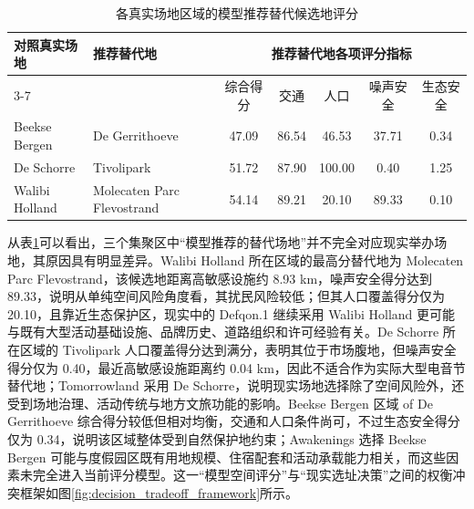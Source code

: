 \documentclass[11pt,a4paper,fontset=fandol]{ctexart}
\begin{document}
\begin{table}[H]
\centering
\caption{各真实场地区域的模型推荐替代候选地评分}
\label{tab:regional_top_non_real_candidates}
\begin{tabularx}{\textwidth}{l X ccccc}
\toprule
对照真实场地 & 推荐替代地 & \multicolumn{5}{c}{推荐替代地各项评分指标} \\
\cmidrule(lr){3-7}
& & 综合得分 & 交通 & 人口 & 噪声安全 & 生态安全 \\
\midrule
Beekse Bergen & De Gerrithoeve & 47.09 & 86.54 & 46.53 & 37.71 & 0.34 \\
De Schorre & Tivolipark & 51.72 & 87.90 & 100.00 & 0.40 & 1.25 \\
Walibi Holland & Molecaten Parc Flevostrand & 54.14 & 89.21 & 20.10 & 89.33 & 0.10 \\
\bottomrule
\end{tabularx}
\end{table}

从表\ref{tab:regional_top_non_real_candidates}可以看出，三个集聚区中“模型推荐的替代场地”并不完全对应现实举办场地，其原因具有明显差异。Walibi Holland 所在区域的最高分替代地为 Molecaten Parc Flevostrand，该候选地距离高敏感设施约 8.93 km，噪声安全得分达到 89.33，说明从单纯空间风险角度看，其扰民风险较低；但其人口覆盖得分仅为 20.10，且靠近生态保护区，现实中的 Defqon.1 继续采用 Walibi Holland 更可能与既有大型活动基础设施、品牌历史、道路组织和许可经验有关。De Schorre 所在区域的 Tivolipark 人口覆盖得分达到满分，表明其位于市场腹地，但噪声安全得分仅为 0.40，最近高敏感设施距离约 0.04 km，因此不适合作为实际大型电音节替代地；Tomorrowland 采用 De Schorre，说明现实场地选择除了空间风险外，还受到场地治理、活动传统与地方文旅功能的影响。Beekse Bergen 区域 of De Gerrithoeve 综合得分较低但相对均衡，交通和人口条件尚可，不过生态安全得分仅为 0.34，说明该区域整体受到自然保护地约束；Awakenings 选择 Beekse Bergen 可能与度假园区既有用地规模、住宿配套和活动承载能力相关，而这些因素未完全进入当前评分模型。这一“模型空间评分”与“现实选址决策”之间的权衡冲突框架如图\ref{fig:decision_tradeoff_framework}所示。
\end{document}
